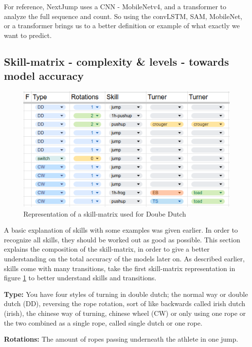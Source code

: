 For reference, NextJump uses a CNN - MobileNetv4, \autocite{MobileNetv4_2024} and a transformer to analyze the full sequence and count. So using the convLSTM, SAM, MobileNet, or a transformer brings us to a better definition or example of what exactly we want to predict.


\subsection{Skill-matrix - complexity \& levels - towards model accuracy}
\label{subsec:skillcomplexiteit}

\begin{figure}
    \centering
    \includegraphics[width=0.95\linewidth]{img/doubledutch-matrix}
    \caption[skill-matrix-DD]{Representation of a skill-matrix used for Doube Dutch}
    \label{fig:doubledutch-skill-matrix}
\end{figure}

A basic explanation of skills with some examples was given earlier. In order to recognize all skills, they should be worked out as good as possible. This section explains the composition of the skill-matrix, in order to give a better understanding on the total accuracy of the models later on. As described earlier, skills come with many transitions, take the first skill-matrix representation in figure \ref{fig:doubledutch-skill-matrix} to better understand skills and transitions.

\textbf{Type:} You have four styles of turning in double dutch; the normal way or double dutch (DD), reversing the rope rotation, sort of like backwards called irish dutch (irish), the chinese way of turning, chinese wheel (CW) or only using one rope or the two combined as a single rope, called single dutch or one rope.

\textbf{Rotations:} The amount of ropes passing underneath the athlete in one jump.

